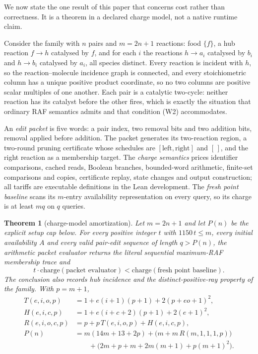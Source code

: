 \documentclass[11pt,a4paper]{article}
\theoremstyle{plain}
\newtheorem{theorem}{Theorem}[section]
\theoremstyle{definition}
\theoremstyle{remark}
\begin{document}
We now state the one result of this paper that concerns cost rather than correctness. It is a theorem in a declared charge model, not a native runtime claim.

Consider the family with $n$ pairs and $m=2n+1$ reactions: food $\{f\}$, a hub reaction $f\to h$ catalysed by $f$, and for each $i$ the reactions $h\to a_i$ catalysed by $b_i$ and $h\to b_i$ catalysed by $a_i$, all species distinct. Every reaction is incident with $h$, so the reaction--molecule incidence graph is connected, and every stoichiometric column has a unique positive product coordinate, so no two columns are positive scalar multiples of one another. Each pair is a catalytic two-cycle: neither reaction has its catalyst before the other fires, which is exactly the situation that ordinary RAF semantics admits and that condition (W2) accommodates.

An \emph{edit packet} is five words: a pair index, two removal bits and two addition bits, removal applied before addition. The packet generates its two-reaction region, a two-round pruning certificate whose schedules are $[\text{left},\text{right}]$ and $[\,]$, and the right reaction as a membership target. The \emph{charge semantics} prices identifier comparisons, cached reads, Boolean branches, bounded-word arithmetic, finite-set comparisons and copies, certificate replay, state changes and output construction; all tariffs are executable definitions in the Lean development. The \emph{fresh point baseline} scans its $m$-entry availability representation on every query, so its charge is at least $mq$ on $q$ queries.

\begin{theorem}[charge-model amortization]\label{thm:family}
Let $m=2n+1$ and let $P(n)$ be the explicit setup cap below. For every positive integer $t$ with $1150\,t\le m$, every initial availability $A$ and every valid pair-edit sequence of length $q>P(n)$, the arithmetic packet evaluator returns the literal sequential maximum-RAF membership trace and
\[
t\cdot\mathrm{charge}(\text{packet evaluator})<\mathrm{charge}(\text{fresh point baseline}).
\]
The conclusion also records hub incidence and the distinct-positive-ray property of the family. With $p=m+1$,
\begin{align*}
T(e,i,o,p)&=1+e(i+1)(p+1)+2(p+eo+1)^{2},\\
H(e,i,c,p)&=1+e(i+c+2)(p+1)+2(e+1)^{2},\\
R(e,i,o,c,p)&=p+p\,T(e,i,o,p)+H(e,i,c,p),\\
P(n)&=m(14m+13+2p)+\big(m+m\,R(m,1,1,1,p)\big)\\
&\qquad+\big(2m+p+m+2m(m+1)+p(m+1)^{2}\big).
\end{align*}
\end{theorem}
\end{document}
